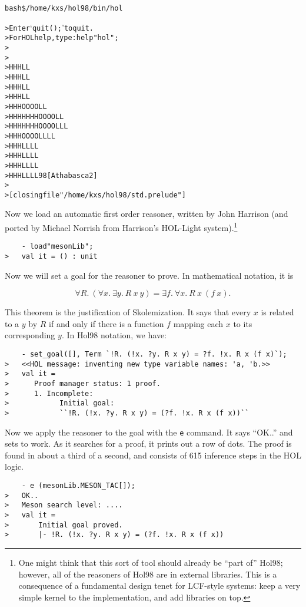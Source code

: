 \documentclass[12pt,fleqn,a4paper]{report}
\begin{document}
\begin{alltt}

     bash\$ /home/kxs/hol98/bin/hol

>    Enter `quit();' to quit.
>    For HOL help, type: help "hol";
>
>
>        HHH                 LL
>        HHH                  LL
>        HHH                   LL
>        HHH                    LL
>        HHH          OOOO       LL
>        HHHHHHH     OO  OO       LL
>        HHHHHHH     OO  OO       LLL
>        HHH          OOOO        LLLL
>        HHH                     LL  LL
>        HHH                    LL    LL
>        HHH                   LL      LL
>        HHH                  LL        LL98 [Athabasca 2]
>
>    [closing file "/home/kxs/hol98/std.prelude"]

\end{alltt}

Now we load an automatic first order reasoner, written by John
Harrison (and ported by Michael Norrish from Harrison's HOL-Light
system).\footnote{One might think that this sort of tool should
  already be ``part of'' Hol98; however, all of the reasoners of Hol98
  are in external libraries. This is a consequence of a fundamental
  design tenet for LCF-style systems: keep a very simple kernel to the
  implementation, and add libraries on top.}
\begin{verbatim}
    - load"mesonLib";
>   val it = () : unit
\end{verbatim}

Now we will set a goal for the reasoner to prove. In mathematical
notation, it is

\[\forall R.\ (\forall x.\  \exists y.\ R\ x\ y) = \exists f.\ \forall
 x.\ R\ x\ (f\ x).\]

 This theorem is the justification of Skolemization. It says that
every $x$ is related to a $y$ by $R$ if and only if there is
a function $f$ mapping each $x$ to its corresponding $y$. In Hol98
notation, we have:
\begin{verbatim}
    - set_goal([], Term `!R. (!x. ?y. R x y) = ?f. !x. R x (f x)`);
>   <<HOL message: inventing new type variable names: 'a, 'b.>>
>   val it =
>      Proof manager status: 1 proof.
>      1. Incomplete:
>            Initial goal:
>            ``!R. (!x. ?y. R x y) = (?f. !x. R x (f x))``
\end{verbatim}

Now we apply the reasoner to the goal with the \verb+e+ command. It says
``OK..'' and sets to work. As it searches for a proof, it prints out a
row of dots. The proof is found in about a third of a second, and
consists of 615 inference steps in the HOL logic.
\begin{verbatim}
    - e (mesonLib.MESON_TAC[]);
>   OK..
>   Meson search level: ....
>   val it =
>       Initial goal proved.
>       |- !R. (!x. ?y. R x y) = (?f. !x. R x (f x))
\end{verbatim}
\end{document}
